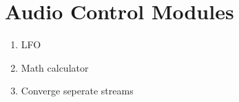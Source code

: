 \section{Audio Control Modules}
\begin{enumerate}
	\item LFO
	\item Math calculator
	\item Converge seperate streams
\end{enumerate}
